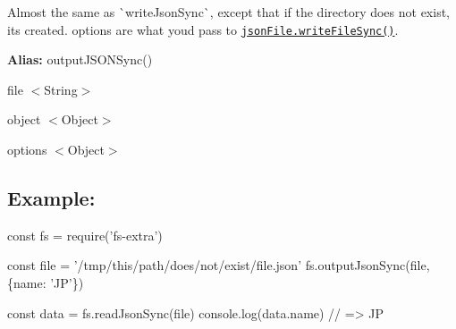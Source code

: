 Almost the same as \`{}write\+Json\+Sync\`{}, except that if the directory does not exist, it\textquotesingle{}s created. {\ttfamily options} are what you\textquotesingle{}d pass to \href{https://github.com/jprichardson/node-jsonfile#writefilesyncfilename-obj-options}{\tt {\ttfamily json\+File.\+write\+File\+Sync()}}.

{\bfseries Alias\+:} {\ttfamily output\+J\+S\+O\+N\+Sync()}


\begin{DoxyItemize}
\item {\ttfamily file} {\ttfamily $<$String$>$}
\item {\ttfamily object} {\ttfamily $<$Object$>$}
\item {\ttfamily options} {\ttfamily $<$Object$>$}
\end{DoxyItemize}

\subsection*{Example\+:}


\begin{DoxyCode}
const fs = require('fs-extra')

const file = '/tmp/this/path/does/not/exist/file.json'
fs.outputJsonSync(file, \{name: 'JP'\})

const data = fs.readJsonSync(file)
console.log(data.name) // => JP
\end{DoxyCode}
 